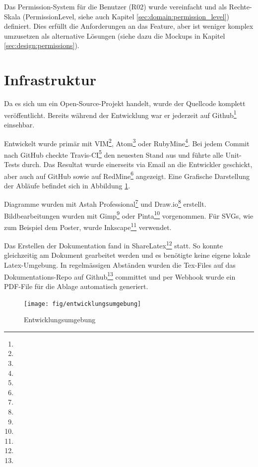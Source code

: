Das Permission-System für die Benutzer (R02) wurde vereinfacht und als Rechte-Skala (PermissionLevel, siehe auch Kapitel \ref{sec:domain:permission_level}) definiert. Dies erfüllt die Anforderungen an das Feature, aber ist weniger komplex umzusetzen als alternative Lösungen (siehe dazu die Mockups in Kapitel \ref{sec:design:permissions}).




\section{Infrastruktur} \label{sec:pm:infrastructure}

Da es sich um ein Open-Source-Projekt handelt, wurde der Quellcode komplett veröffentlicht. Bereits während der Entwicklung war er jederzeit auf Github\footnote{} einsehbar.

Entwickelt wurde primär mit VIM\footnote{}, Atom\footnote{} oder RubyMine\footnote{}. Bei jedem Commit nach GitHub checkte Travis-CI\footnote{} den neuesten Stand aus und führte alle Unit-Tests durch. Das Resultat wurde einerseits via Email an die Entwickler geschickt, aber auch auf GitHub sowie auf RedMine\footnote{} angezeigt. Eine Grafische Darstellung der Abläufe befindet sich in Abbildung \ref{fig:pm:entwicklungsumgebung}.


Diagramme wurden mit Astah Professional\footnote{} und Draw.io\footnote{} erstellt. Bildbearbeitungen wurden mit Gimp\footnote{} oder Pinta\footnote{} vorgenommen. Für SVGs, wie zum Beispiel dem Poster, wurde Inkscape\footnote{} verwendet.

Das Erstellen der Dokumentation fand in ShareLatex\footnote{} statt. So konnte gleichzeitig am Dokument gearbeitet werden und es benötigte keine eigene lokale Latex-Umgebung. In regelmässigen Abständen wurden die Tex-Files auf das Dokumentations-Repo auf Github\footnote{} committet und per Webhook wurde ein PDF-File für die Ablage automatisch generiert.

\begin{figure}[H]
	\centering
	\texttt{[image: fig/entwicklungsumgebung]}
	\caption{Entwicklungsumgebung}
	\label{fig:pm:entwicklungsumgebung}
\end{figure}

